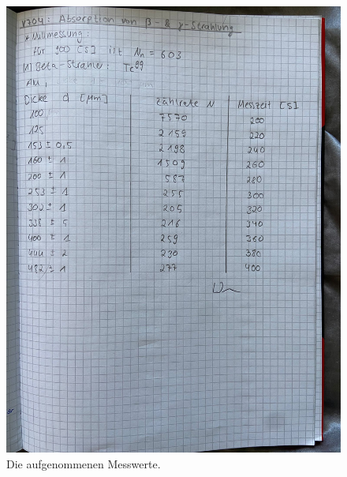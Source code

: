 \begin{figure}[H]
  \centering
  \includegraphics{content/messbeta.jpeg}
  \caption{Die aufgenommenen Messwerte.}
  \label{fig:messbeta}
\end{figure}
